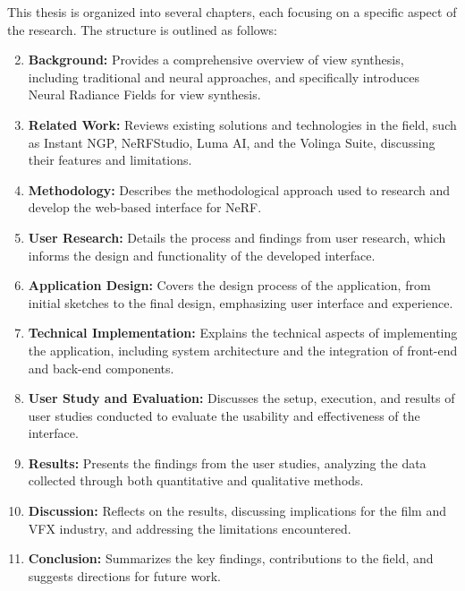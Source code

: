 This thesis is organized into several chapters, each focusing on a specific aspect of the research.
The structure is outlined as follows:

\begin{enumerate}
    \setcounter{enumi}{1}
    \item \textbf{Background:} Provides a comprehensive overview of view synthesis, including traditional and neural approaches, and specifically introduces Neural Radiance Fields for view synthesis.
    \item \textbf{Related Work:} Reviews existing solutions and technologies in the field, such as Instant NGP, NeRFStudio, Luma AI, and the Volinga Suite, discussing their features and limitations.
    \item \textbf{Methodology:} Describes the methodological approach used to research and develop the web-based interface for NeRF.
    \item \textbf{User Research:} Details the process and findings from user research, which informs the design and functionality of the developed interface.
    \item \textbf{Application Design:} Covers the design process of the application, from initial sketches to the final design, emphasizing user interface and experience.
    \item \textbf{Technical Implementation:} Explains the technical aspects of implementing the application, including system architecture and the integration of front-end and back-end components.
    \item \textbf{User Study and Evaluation:} Discusses the setup, execution, and results of user studies conducted to evaluate the usability and effectiveness of the interface.
    \item \textbf{Results:} Presents the findings from the user studies, analyzing the data collected through both quantitative and qualitative methods.
    \item \textbf{Discussion:} Reflects on the results, discussing implications for the film and VFX industry, and addressing the limitations encountered.
    \item \textbf{Conclusion:} Summarizes the key findings, contributions to the field, and suggests directions for future work.
\end{enumerate}


